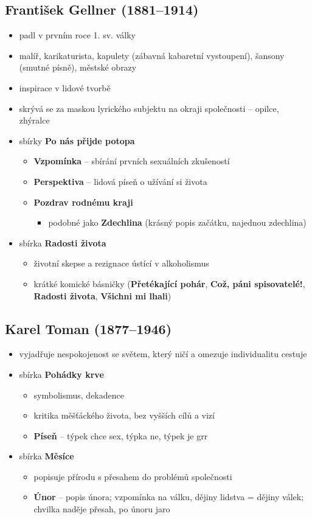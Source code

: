 \subsection{František Gellner (1881--1914)}
\begin{itemize}
\item padl v prvním roce 1. sv. války
\item malíř, karikaturista, kapulety (zábavná kabaretní vystoupení), šansony (smutné písně), městské obrazy
\item inspirace v lidové tvorbě
\item skrývá se za maskou lyrického subjektu na okraji společnosti -- opilce, zhýralce
\item sbírky \textbf{Po nás přijde potopa}
	\begin{itemize}
	\item \textbf{Vzpomínka} -- sbírání prvních sexuálních zkušeností
	\item \textbf{Perspektiva} -- lidová píseň o užívání si života
	\item \textbf{Pozdrav rodnému kraji}
		\begin{itemize}
		\item podobné jako \textbf{Zdechlina} (krásný popis začátku, najednou zdechlina)
		\end{itemize}
	\end{itemize}
\item sbírka \textbf{Radosti života}
	\begin{itemize}
	\item životní skepse a rezignace ústící v alkoholismus
	\item krátké komické básničky (\textbf{Přetékající pohár}, \textbf{Což, páni spisovatelé!}, \textbf{Radosti života}, \textbf{Všichni mi lhali})
	\end{itemize}
\end{itemize}

\subsection{Karel Toman (1877--1946)}
\begin{itemize}
\item vyjadřuje nespokojenost se světem, který ničí a omezuje individualitu \ra cestuje
\item sbírka \textbf{Pohádky krve}
	\begin{itemize}
	\item symbolismus, dekadence
	\item kritika měšťáckého života, bez vyšších cílů a vizí
	\item \textbf{Píseň} -- týpek chce sex, týpka ne, týpek je grr
	\end{itemize}
\item sbírka \textbf{Měsíce}
	\begin{itemize}
	\item popisuje přírodu s přesahem do problémů společnosti
	\item \textbf{Únor} – popis února; vzpomínka na válku, dějiny lidstva = dějiny válek; chvilka naděje \ra přesah, po únoru jaro
	\end{itemize}
\end{itemize}

